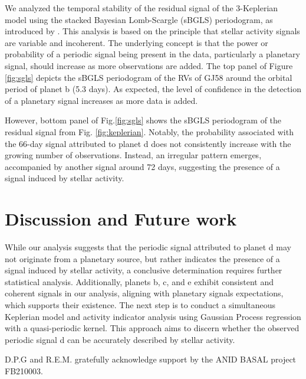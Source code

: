 \documentclass[baaa]{baaa}
\begin{document}
We analyzed the temporal stability of the residual signal of the 3-Keplerian model using the stacked Bayesian Lomb-Scargle (sBGLS) periodogram, as introduced by \cite{2017SBGLS}. This analysis is based on the principle that stellar activity signals are variable and incoherent. The underlying concept is that the power or probability of a periodic signal being present in the data, particularly a planetary signal, should increase as more observations are added. The top panel of Figure \ref{fig:sgls} depicts the sBGLS periodogram of the RVs of GJ58 around the orbital period of planet b (5.3 days). As expected, the level of confidence in the detection of a planetary signal increases as more data is added.

However, bottom panel of Fig.\ref{fig:sgls} shows the sBGLS periodogram of the residual signal from Fig. \ref{fig:keplerian}. Notably, the probability associated with the 66-day signal attributed to planet d does not consistently increase with the growing number of observations. Instead, an irregular pattern emerges, accompanied by another signal around 72 days, suggesting the presence of a signal induced by stellar activity.

\section{Discussion and Future work}\label{sec5}


While our analysis suggests that the periodic signal attributed to planet d may not originate from a planetary source, but rather indicates the presence of a signal induced by stellar activity, a conclusive determination requires further statistical analysis. Additionally, planets b, c, and e exhibit consistent and coherent signals in our analysis, aligning with planetary signals expectations, which supports their existence. The next step is to conduct a simultaneous Keplerian model and activity indicator analysis using Gaussian Process regression with a quasi-periodic kernel. This approach aims to discern whether the observed periodic signal d can be accurately described by stellar activity.



\begin{acknowledgement}
D.P.G and R.E.M. gratefully acknowledge support by the ANID BASAL project FB210003.
\end{acknowledgement}
\end{document}
